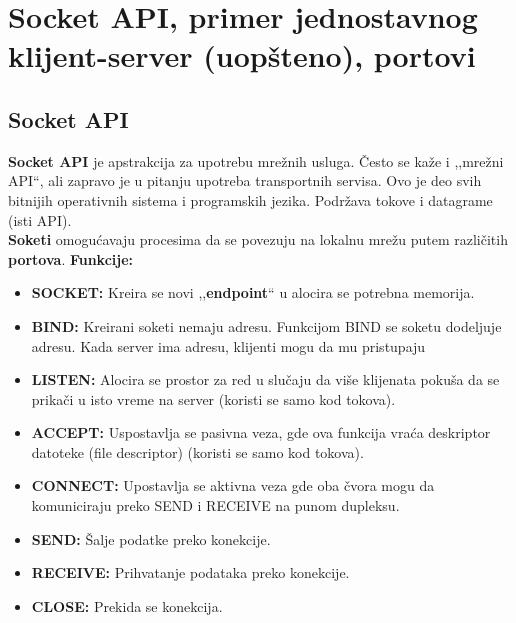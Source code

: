 \documentclass[a4paper]{article}
\begin{document}
\section{Socket API, primer jednostavnog klijent-server (uopšteno), portovi}
    \subsection{Socket API}
        \textbf{Socket API} je apstrakcija za upotrebu mrežnih usluga. Često se kaže i ,,mrežni API``,
        ali zapravo je u pitanju upotreba transportnih servisa. Ovo je deo svih bitnijih 
        operativnih sistema i programskih jezika. Podržava tokove i datagrame (isti API). \\
            \textbf{Soketi} omogućavaju procesima da se povezuju na lokalnu mrežu putem različitih
            \textbf{portova}.
        \textbf{Funkcije:}
        \begin{itemize}
            \item \textbf{SOCKET:} Kreira se novi ,,\textbf{endpoint}`` u alocira se potrebna 
                  memorija.
            \item \textbf{BIND:} Kreirani soketi nemaju adresu. Funkcijom BIND se soketu
                  dodeljuje adresu. Kada server ima adresu, klijenti mogu da mu pristupaju 
            \item \textbf{LISTEN:} Alocira se prostor za red u slučaju da više klijenata
                  pokuša da se prikači u isto vreme na server (koristi se samo kod tokova). 
            \item \textbf{ACCEPT:} Uspostavlja se pasivna veza, gde ova funkcija vraća 
                  deskriptor datoteke (file descriptor) (koristi se samo kod tokova). 
            \item \textbf{CONNECT:} Upostavlja se aktivna veza gde oba 
                  čvora mogu da komuniciraju preko SEND i RECEIVE na punom dupleksu. 
            \item \textbf{SEND:} Šalje podatke preko konekcije. 
            \item \textbf{RECEIVE:} Prihvatanje podataka preko konekcije. 
            \item \textbf{CLOSE:} Prekida se konekcija.
        \end{itemize}
\end{document}
